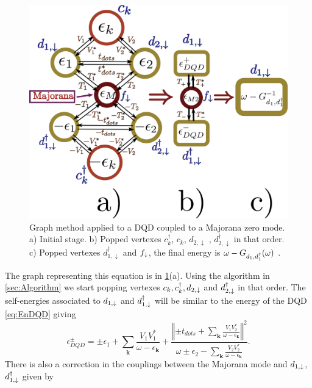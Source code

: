  
     \begin{figure}[bt]
    \centering
    \includegraphics[scale=0.4]{IMAGES/Graphs/FinalGraph.png}
    \caption{\label{fig:Graph-MDQD} Graph method applied to a DQD coupled to a Majorana zero mode. a) Initial stage. b) Popped vertexes $c^\dagger_k$, $c_k$, $d_{2, \downarrow}$ , $d^\dagger_{2, \downarrow}$ in that order. c) Popped vertexes $d^\dagger_{1, \downarrow}$ and $f_\downarrow$, the final energy is $\omega-G_{d_1,d_1^\dagger}(\omega)$  . \protect\Source{   }} 
    \end{figure}

 The graph representing this equation is in  \ref{fig:Graph-MDQD}(a). Using the algorithm in \ref{sec:Algorithm} we start popping vertexes $c_k,c^\dagger_k, d_{2,\downarrow}$ and $ d^\dagger_{2,\downarrow}$ in that order. The self-energies associated to $d_{1,\downarrow}$ and $d^\dagger_{1,\downarrow}$ will be similar to the energy of the DQD \eqref{eq:EnDQD} giving 
\begin{equation}
    \epsilon_{DQD}^{\pm}=\pm\epsilon_{1}+\sum_{\mathbf{k}}\frac{V_{1}V_{1}^{*}}{\omega-\epsilon_{\mathbf{k}}}+\frac{\left\Vert \pm t_{dots}+\sum_{\mathbf{k}}\frac{V_{1}V_{2}^{*}}{\omega-\epsilon_{\mathbf{k}}}\right\Vert ^{2}}{\omega\pm\epsilon_{2}-\sum_{\mathbf{k}}\frac{V_{2}V_{2}^{*}}{\omega-\epsilon_{\mathbf{k}}}}. \label{eq:epDQD}
\end{equation}
\noindent There is also a correction in the couplings between the Majorana mode and $d_{1,\downarrow}$, $d^\dagger_{1,\downarrow}$ given by 

